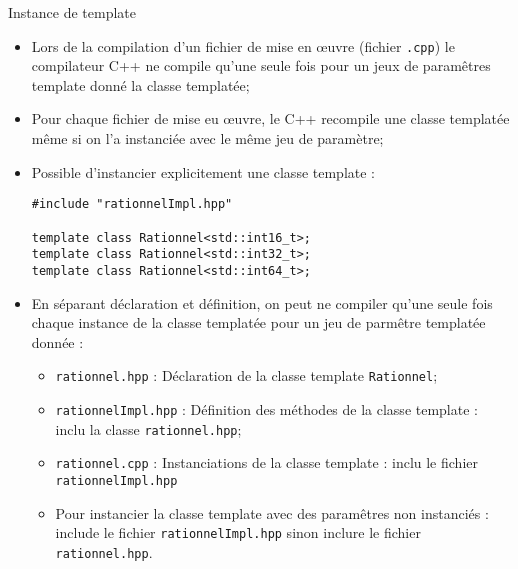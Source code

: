 \documentclass[compress,10pt,aspectratio=169]{beamer}
\begin{document}
\begin{frame}[fragile]{Instance de template}
\scriptsize

\begin{itemize}
\item Lors de la compilation d'un fichier de mise en {\oe}uvre (fichier \texttt{.cpp})
      le compilateur C++ ne compile qu'une seule fois pour un jeux de paramêtres template
      donné la classe templatée;
\item Pour chaque fichier de mise eu {\oe}uvre, le C++ recompile une classe templatée même
      si on l'a instanciée avec le même jeu de paramètre;
\item Possible d'instancier explicitement une classe template :
\begin{verbatim}
#include "rationnelImpl.hpp"

template class Rationnel<std::int16_t>;
template class Rationnel<std::int32_t>;
template class Rationnel<std::int64_t>;
\end{verbatim}
\item En séparant déclaration et définition, on peut ne compiler qu'une seule fois 
      chaque instance de la classe templatée pour un jeu de parmêtre templatée donnée :
\begin{itemize}
\scriptsize
\item \texttt{rationnel.hpp} : Déclaration de la classe template \texttt{Rationnel};
\item \texttt{rationnelImpl.hpp} : Définition des méthodes de la classe template : inclu la classe \texttt{rationnel.hpp};
\item \texttt{rationnel.cpp} : Instanciations de la classe template : inclu le fichier \texttt{rationnelImpl.hpp}
\item Pour instancier la classe template avec des paramêtres non instanciés : include le fichier \texttt{rationnelImpl.hpp}
      sinon inclure le fichier \texttt{rationnel.hpp}.
\end{itemize}
\end{itemize}
\end{frame}
\end{document}

